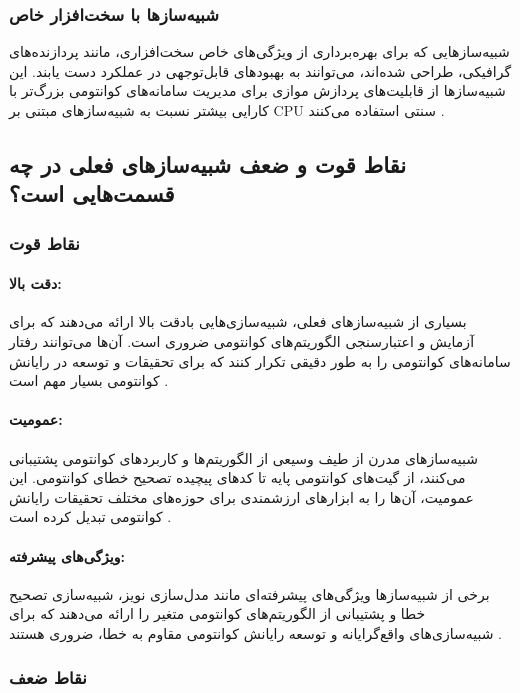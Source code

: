 \subsubsection{شبیه‌سازها با سخت‌افزار خاص}
شبیه‌سازهایی که برای بهره‌برداری از ویژگی‌های خاص سخت‌افزاری، مانند پردازنده‌های گرافیکی، طراحی شده‌اند، می‌توانند به بهبودهای قابل‌توجهی در عملکرد دست یابند. این شبیه‌سازها از قابلیت‌های پردازش موازی برای مدیریت سامانه‌های کوانتومی بزرگ‌تر با کارایی بیشتر نسبت به شبیه‌سازهای مبتنی بر CPU سنتی استفاده می‌کنند \cite{young_simulating_2023, xu_herculean_2023}.


\subsection*{نقاط قوت و ضعف شبیه‌سازهای فعلی در چه قسمت‌هایی است؟}
\subsubsection{نقاط قوت}
\paragraph{دقت بالا:}
بسیاری از شبیه‌سازهای فعلی، شبیه‌سازی‌هایی بادقت بالا ارائه می‌دهند که برای آزمایش و اعتبارسنجی الگوریتم‌های کوانتومی ضروری است. آن‌ها می‌توانند رفتار سامانه‌های کوانتومی را به طور دقیقی تکرار کنند که برای تحقیقات و توسعه در رایانش کوانتومی بسیار مهم است \cite{young_simulating_2023}.

\paragraph{عمومیت:}
شبیه‌سازهای مدرن از طیف وسیعی از الگوریتم‌ها و کاربردهای کوانتومی پشتیبانی می‌کنند، از گیت‌های کوانتومی پایه تا کدهای پیچیده تصحیح خطای کوانتومی. این عمومیت، آن‌ها را به ابزارهای ارزشمندی برای حوزه‌های مختلف تحقیقات رایانش کوانتومی تبدیل کرده است \cite{xu_herculean_2023}.

\paragraph{ویژگی‌های پیشرفته:}
برخی از شبیه‌سازها ویژگی‌های پیشرفته‌ای مانند مدل‌سازی نویز، شبیه‌سازی تصحیح خطا و پشتیبانی از الگوریتم‌های کوانتومی متغیر را ارائه می‌دهند که برای شبیه‌سازی‌های واقع‌گرایانه و توسعه رایانش کوانتومی مقاوم به خطا، ضروری هستند \cite{jamadagni_benchmarking_2024}.

\subsubsection{نقاط ضعف}
